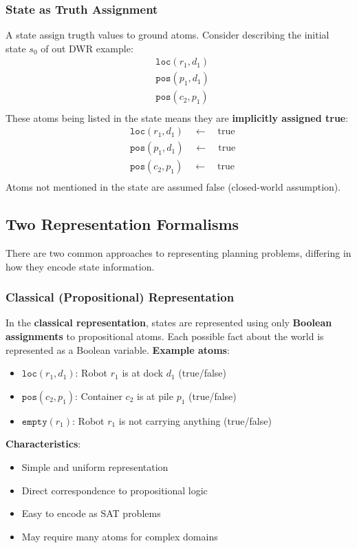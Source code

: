 \documentclass[a4paper]{article}
\theoremstyle{definition}
\begin{document}
\subsubsection{State as Truth Assignment}
A state assign trugth values to ground atoms. Consider describing the initial state \( s_0 \) of out DWR example:
\begin{align*}
    &\texttt{loc}(r_1,d_1)\\
    &\texttt{pos}(p_1,d_1)\\
    &\texttt{pos}(c_2,p_1)\\
\end{align*}
These atoms being listed in the state means they are \textbf{implicitly assigned true}:
\begin{align*}
    &\texttt{loc}(r_1,d_1) \quad \leftarrow \quad \text{true}\\
    &\texttt{pos}(p_1,d_1) \quad \leftarrow \quad \text{true}\\
    &\texttt{pos}(c_2,p_1) \quad \leftarrow \quad \text{true}\\
\end{align*}
Atoms not mentioned in the state are assumed false (closed-world assumption).
\subsection{Two Representation Formalisms}
There are two common approaches to representing planning problems, differing in how they encode state information.
\subsubsection{Classical (Propositional) Representation}
In the \textbf{classical representation}, states are represented using only \textbf{Boolean assignments} to propositional atoms.
Each possible fact about the world is represented as a Boolean variable.
\vspace{1em}
\noindent
\newline
\textbf{Example atoms}:
\begin{itemize}
    \item \( \texttt{loc}(r_1,d_1) \): Robot \( r_1 \) is at dock \( d_1 \) (true/false)
    \item \( \texttt{pos}(c_2,p_1) \): Container \( c_2 \) is at pile \( p_1 \) (true/false)
    \item \( \texttt{empty}(r_1) \): Robot \( r_1 \) is not carrying anything (true/false)
\end{itemize}
\textbf{Characteristics}:
\begin{itemize}
    \item Simple and uniform representation 
    \item Direct correspondence to propositional logic 
    \item Easy to encode as SAT problems 
    \item May require many atoms for complex domains
\end{itemize}
\end{document}
